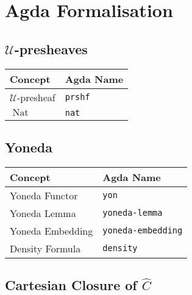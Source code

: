 \documentclass[12pt, parskip, DIV=14]{scrbook}
\newcommand{\Nat}{\operatorname{Nat}}
\begin{document}
\section{Agda Formalisation}

\subsection{$\mathcal{U}$-presheaves}

\begin{center}
\begin{tabular}{ll}
  Concept & Agda Name \\
  \hline
  $\mathcal{U}$-presheaf & \texttt{prshf} \\
  $\Nat$ & \texttt{nat} \\
\end{tabular}
\end{center}

\subsection{Yoneda}

\begin{center}
\begin{tabular}{ll}
  Concept & Agda Name \\
  \hline
  Yoneda Functor & \texttt{yon} \\
  Yoneda Lemma & \texttt{yoneda-lemma} \\
  Yoneda Embedding & \texttt{yoneda-embedding} \\
  Density Formula & \texttt{density} \\
\end{tabular}
\end{center}

\subsection{Cartesian Closure of $\widehat{C}$}
\end{document}
